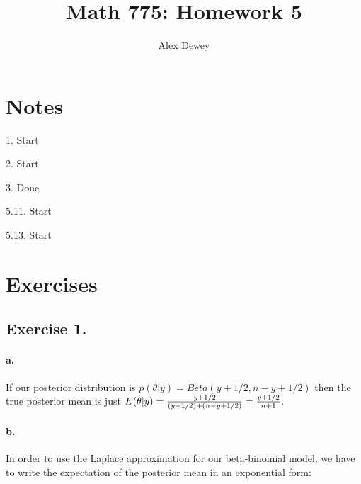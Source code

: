 \documentclass{article}
\begin{document}
\title{Math 775: Homework 5}
\author{Alex Dewey}


\maketitle

\section{Notes}

1. Start

2. Start

3. Done

5.11. Start

5.13. Start


\section{Exercises}

\subsection{Exercise 1.}

\paragraph{a.} If our posterior distribution is \(p(\theta \vert y) = Beta(y + 1/2, n - y + 1/2)\)
then the true posterior mean is just \(E(\theta \vert y) = {y + 1/2 \over (y + 1/2) + (n - y + 1/2)} = 
{y + 1/2 \over n + 1}\).

\paragraph{b.}

In order to use the Laplace approximation for our beta-binomial model, we have to write the expectation
of the posterior mean in an exponential form:
\end{document}

